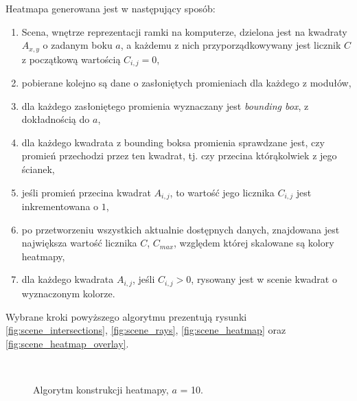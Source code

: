Heatmapa generowana jest w następujący sposób:
\begin{enumerate}
 \item Scena, wnętrze reprezentacji ramki na komputerze, dzielona jest na kwadraty $A_{x,y}$ o zadanym boku $a$, a każdemu z nich przyporządkowywany jest licznik $C$ z początkową wartością $C_{i,j} = 0$,
 \item pobierane kolejno są dane o zasłoniętych promieniach dla każdego z modułów,
 \item dla każdego zasłoniętego promienia wyznaczany jest \textit{bounding box}, z dokładnością do $a$,
 \item dla każdego kwadrata z bounding boksa promienia sprawdzane jest, czy promień przechodzi przez ten kwadrat, tj. czy przecina którąkolwiek z jego ścianek,
 \item jeśli promień przecina kwadrat $A_{i,j}$, to wartość jego licznika $C_{i,j}$ jest inkrementowana o $1$,
 \item po przetworzeniu wszystkich aktualnie dostępnych danych, znajdowana jest największa wartość licznika $C$, $C_{max}$, względem której skalowane są kolory heatmapy,
 \item dla każdego kwadrata $A_{i,j}$, jeśli $C_{i,j} > 0$, rysowany jest w scenie kwadrat o wyznaczonym kolorze.
\end{enumerate}

Wybrane kroki powyższego algorytmu prezentują rysunki \ref{fig:scene_intersections}, \ref{fig:scene_rays}, \ref{fig:scene_heatmap} oraz \ref{fig:scene_heatmap_overlay}.

\begin{sidewaysfigure}[tbh]
  \myfloatalign
   \quad
   \\
   \quad
  \caption[Algorytm konstrukcji heatmapy]{Algorytm konstrukcji heatmapy, $a$ = 10.}\label{fig:scene_heatmap_algorithm}
\end{sidewaysfigure}

